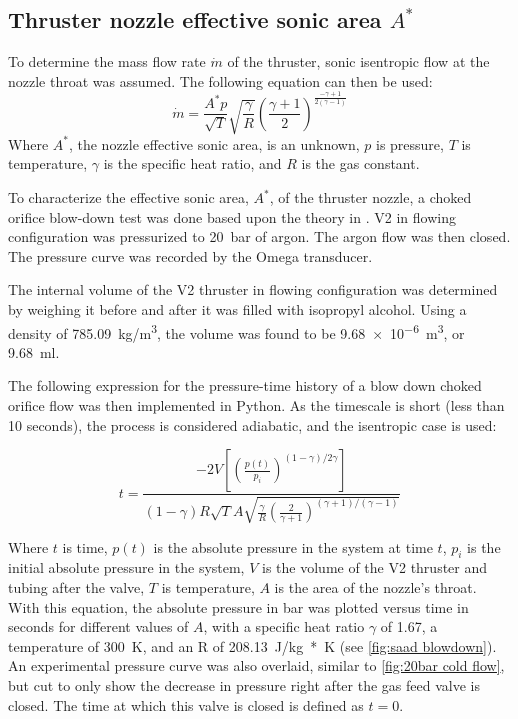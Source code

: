         \subsection{Thruster nozzle effective sonic area $A^*$}

            To determine the mass flow rate $\dot{m}$ of the thruster, sonic isentropic flow at the nozzle throat was assumed. The following equation can then be used:
            \begin{equation}
                \dot{m} = \frac{A^* p}{\sqrt{T}}\sqrt{\frac{\gamma}{R}}\left(\frac{\gamma + 1}{2}\right)^{\frac{-\gamma + 1}{2(\gamma-1)}}
            \end{equation}
            Where $A^*$, the nozzle effective sonic area, is an unknown, $p$ is pressure, $T$ is temperature, $\gamma$ is the specific heat ratio, and $R$ is the gas constant.
        
            To characterize the effective sonic area, $A^*$, of the thruster nozzle, a choked orifice blow-down test was done based upon the theory in \textcite{saadCompressibleFluidFlow}. V2 in flowing configuration was pressurized to \qty{20}{bar} of argon. The argon flow was then closed. The pressure curve was recorded by the Omega transducer.

            The internal volume of the V2 thruster in flowing configuration was determined by weighing it before and after it was filled with isopropyl alcohol. Using a density of \qty{785.09}{kg/m^3}, the volume was found to be \qty{9.68e-6}{m^3}, or \qty{9.68}{ml}.

            The following expression for the pressure-time history of a blow down choked orifice flow \cite{saadCompressibleFluidFlow} was then implemented in Python. As the timescale is short (less than 10 seconds), the process is considered adiabatic, and the isentropic case is used:

            \begin{equation}
                t =  \frac{-2V \left[\left(\frac{p(t)}{p_i}\right)^{(1-\gamma) / 2\gamma}\right]}{(1-\gamma) R \sqrt{T} A \sqrt{\frac{\gamma}{R}(\frac{2}{\gamma + 1})^{(\gamma+1) / (\gamma-1)}}}
            \end{equation}

            Where $t$ is time, $p(t)$ is the absolute pressure in the system at time $t$, $p_i$ is the initial absolute pressure in the system, $V$ is the volume of the V2 thruster and tubing after the valve, $T$ is temperature, $A$ is the area of the nozzle's throat. With this equation, the absolute pressure in bar was plotted versus time in seconds for different values of $A$, with a specific heat ratio $\gamma$ of 1.67, a temperature of \qty{300}{K}, and an R of \qty{208.13}{J/kg*K} (see \autoref{fig:saad blowdown}). An experimental pressure curve was also overlaid, similar to \autoref{fig:20bar cold flow}, but cut to only show the decrease in pressure right after the gas feed valve is closed. The time at which this valve is closed is defined as $t=0$.

